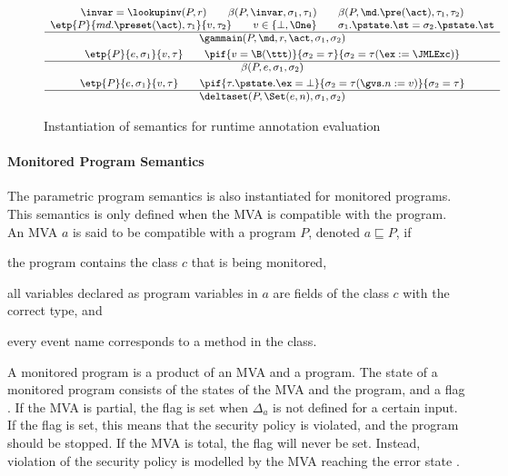 \begin{figure}[t]
\[{\small
\begin{array}[t]{c}
\invar = \lookupinv(P, r) \qquad
\beta(P, \invar, \sigma_1, \tau_1) \qquad
\beta(P, \md.\pre(\act), \tau_1, \tau_2) \\
\etp{P}{md.\preset(\act), \tau_1}{v,\tau_2} \qquad v\in\{\bot,\One\} \qquad
\sigma_1.\pstate.\st = \sigma_2.\pstate.\st\\
\hline
\gammain(P, \md, r, \act, \sigma_1, \sigma_2)
\smallskip\\


\etp{P}{e, \sigma_1}{v, \tau} \qquad
\pif{v = \B(\ttt)}{\sigma_2 = \tau}{\sigma_2 = \tau (\ex := \JMLExc)}\\
\hline
\beta(P, e, \sigma_1, \sigma_2)

\smallskip\\

\etp{P}{e, \sigma_1}{v, \tau} \qquad
\pif{\tau.\pstate.\ex = \bot}{\sigma_2 = \tau (\gvs.n := v)}{\sigma_2 = \tau}\\
\hline
\deltaset(P, \Set(e, n), \sigma_1, \sigma_2)
\end{array}}
\]
\caption{Instantiation of semantics for runtime annotation evaluation}
\label{FigAnnotatedSem}
\end{figure}


\paragraph{Monitored Program Semantics}
The parametric program semantics is also instantiated for monitored
programs. This semantics is only defined when the MVA is compatible
with the program. An MVA \(a\) is said to be compatible with a program
\(P\), denoted \(a \sqsubseteq P\), if
\begin{inparaenum}
\item the program contains the class \(c\) that is being monitored,
\item all variables declared as program variables in
\(a\) are fields of the class \(c\) with the correct type, and
\item every event name corresponds to a method in the class.
\end{inparaenum}
A monitored program is a product of an MVA and a program. The state
of a monitored program consists of the states of the MVA and the
program, and a flag \stuck. If the MVA is partial, the flag
\stuck is set when \(\Delta_a\) is not defined for a
certain input. If the flag is set, this means that the security policy
is violated, and the program should be stopped. If the MVA is total,
the \stuck flag will never be set. Instead, violation of the security
policy is modelled by the MVA reaching the error state \halted.

